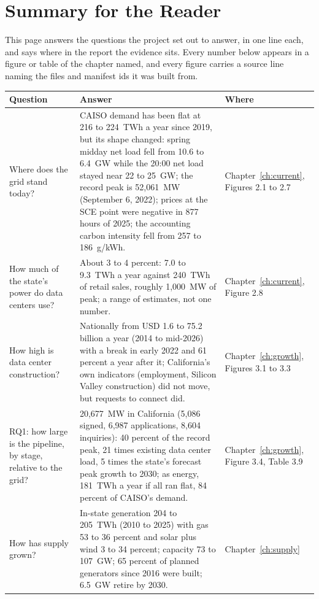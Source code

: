 \chapter*{Summary for the Reader}

This page answers the questions the project set out to answer, in one line each, and says where in the report the evidence sits. Every number below appears in a figure or table of the chapter named, and every figure carries a source line naming the files and manifest ids it was built from.

\begin{table}[H]
\centering\footnotesize
\begin{tabular}{p{4.0cm}p{8.4cm}p{2.6cm}}
\toprule
Question & Answer & Where \\
\midrule
Where does the grid stand today? & CAISO demand has been flat at 216 to 224~TWh a year since 2019, but its shape changed: spring midday net load fell from 10.6 to 6.4~GW while the 20:00 net load stayed near 22 to 25~GW; the record peak is 52,061~MW (September 6, 2022); prices at the SCE point were negative in 877 hours of 2025; the accounting carbon intensity fell from 257 to 186~g/kWh. & Chapter~\ref{ch:current}, Figures 2.1 to 2.7 \\
How much of the state's power do data centers use? & About 3 to 4 percent: 7.0 to 9.3~TWh a year against 240~TWh of retail sales, roughly 1,000~MW of peak; a range of estimates, not one number. & Chapter~\ref{ch:current}, Figure 2.8 \\
How high is data center construction? & Nationally from USD 1.6 to 75.2 billion a year (2014 to mid-2026) with a break in early 2022 and 61 percent a year after it; California's own indicators (employment, Silicon Valley construction) did not move, but requests to connect did. & Chapter~\ref{ch:growth}, Figures 3.1 to 3.3 \\
RQ1: how large is the pipeline, by stage, relative to the grid? & 20,677~MW in California (5,086 signed, 6,987 applications, 8,604 inquiries): 40 percent of the record peak, 21 times existing data center load, 5 times the state's forecast peak growth to 2030; as energy, 181~TWh a year if all ran flat, 84 percent of CAISO's demand. & Chapter~\ref{ch:growth}, Figure 3.4, Table 3.9 \\
How has supply grown? & In-state generation 204 to 205~TWh (2010 to 2025) with gas 53 to 36 percent and solar plus wind 3 to 34 percent; capacity 73 to 107~GW; 65 percent of planned generators since 2016 were built; 6.5~GW retire by 2030. & Chapter~\ref{ch:supply} \\

\end{tabular}
\end{table}
